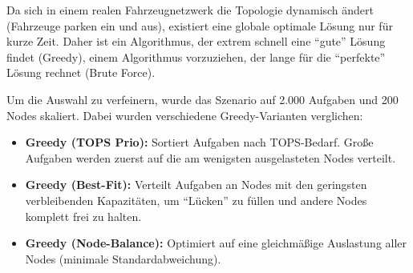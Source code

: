 Da sich in einem realen Fahrzeugnetzwerk die Topologie dynamisch ändert (Fahrzeuge parken ein und aus), existiert eine globale optimale Lösung nur für kurze Zeit. Daher ist ein Algorithmus, der extrem schnell eine \enquote{gute} Lösung findet (Greedy), einem Algorithmus vorzuziehen, der lange für die \enquote{perfekte} Lösung rechnet (Brute Force).

Um die Auswahl zu verfeinern, wurde das Szenario auf 2.000 Aufgaben und 200 Nodes skaliert. Dabei wurden verschiedene Greedy-Varianten verglichen:
\begin{itemize}
    \item \textbf{Greedy (TOPS Prio):} Sortiert Aufgaben nach TOPS-Bedarf. Große Aufgaben werden zuerst auf die am wenigsten ausgelasteten Nodes verteilt.
    \item \textbf{Greedy (Best-Fit):} Verteilt Aufgaben an Nodes mit den geringsten verbleibenden Kapazitäten, um \enquote{Lücken} zu füllen und andere Nodes komplett frei zu halten.
    \item \textbf{Greedy (Node-Balance):} Optimiert auf eine gleichmäßige Auslastung aller Nodes (minimale Standardabweichung).
\end{itemize}

